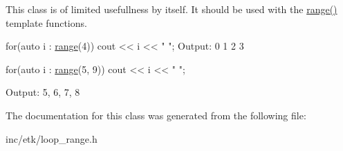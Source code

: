 This class is of limited usefullness by itself. It should be used with the \hyperlink{namespaceetk_aff39b0f367ee4d947e2e7d297ffd506b}{range()} template functions. 


\begin{DoxyCode}
\textcolor{keywordflow}{for}(\textcolor{keyword}{auto} i : \hyperlink{namespaceetk_aff39b0f367ee4d947e2e7d297ffd506b}{range}(4))
    cout << i << \textcolor{stringliteral}{" "};
  Output: 0 1 2 3
\end{DoxyCode}
 
\begin{DoxyCode}
\textcolor{keywordflow}{for}(\textcolor{keyword}{auto} i : \hyperlink{namespaceetk_aff39b0f367ee4d947e2e7d297ffd506b}{range}(5, 9))
    cout << i << \textcolor{stringliteral}{" "};
\end{DoxyCode}
 Output\-: 5, 6, 7, 8 

The documentation for this class was generated from the following file\-:\begin{DoxyCompactItemize}
\item 
inc/etk/loop\-\_\-range.\-h\end{DoxyCompactItemize}
